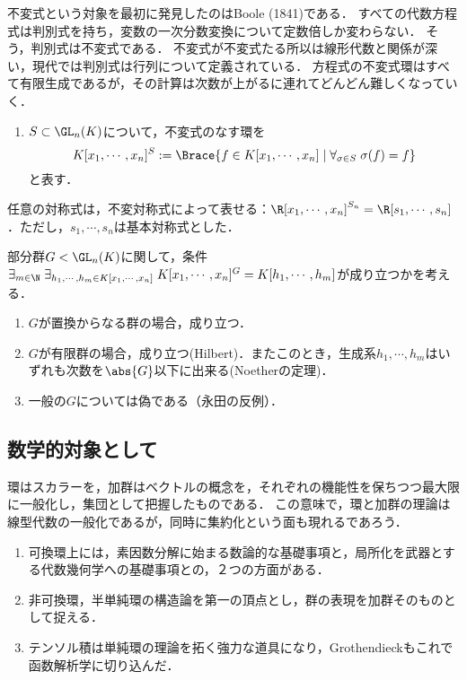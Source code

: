 \documentclass[uplatex,dvipdfmx]{jsreport}
\begin{document}
\begin{history}
    不変式という対象を最初に発見したのはBoole (1841)である．
    すべての代数方程式は判別式を持ち，変数の一次分数変換について定数倍しか変わらない．
    そう，判別式は不変式である．
    不変式が不変式たる所以は線形代数と関係が深い，現代では判別式は行列について定義されている．
    方程式の不変式環はすべて有限生成であるが，その計算は次数が上がるに連れてどんどん難しくなっていく．
\end{history}

\begin{definition}\mbox{}
    \begin{enumerate}
        \item $S\subset\GL_n(K)$について，不変式のなす環を
        \[K[x_1,\cdots,x_n]^S:=\Brace{f\in K[x_1,\cdots,x_n]\mid\forall_{\sigma\in S}\;\sigma(f)=f}\]
        と表す．
    \end{enumerate}
\end{definition}

\begin{corollary}
    任意の対称式は，不変対称式によって表せる：$\R[x_1,\cdots,x_n]^{S_n}=\R[s_1,\cdots,s_n]$．ただし，$s_1,\cdots,s_n$は基本対称式とした．
\end{corollary}

\begin{theorem}[Hilbert 14]
    部分群$G<\GL_n(K)$に関して，条件
    $\exists_{m\in\N}\;\exists_{h_1,\cdots,h_m\in K[x_1,\cdots,x_n]}\;K[x_1,\cdots,x_n]^G=K[h_1,\cdots,h_m]$が成り立つかを考える．
    \begin{enumerate}
        \item $G$が置換からなる群の場合，成り立つ．
        \item $G$が有限群の場合，成り立つ(Hilbert)．またこのとき，生成系$h_1,\cdots,h_m$はいずれも次数を$\abs{G}$以下に出来る(Noetherの定理)．
        \item 一般の$G$については偽である（永田の反例）．
    \end{enumerate}
\end{theorem}

\subsection{数学的対象として}

\begin{remarks}
    環はスカラーを，加群はベクトルの概念を，それぞれの機能性を保ちつつ最大限に一般化し，集団として把握したものである．
    この意味で，環と加群の理論は線型代数の一般化であるが，同時に集約化という面も現れるであろう．
    \begin{enumerate}
        \item 可換環上には，素因数分解に始まる数論的な基礎事項と，局所化を武器とする代数幾何学への基礎事項との，２つの方面がある．
        \item 非可換環，半単純環の構造論を第一の頂点とし，群の表現を加群そのものとして捉える．
        \item テンソル積は単純環の理論を拓く強力な道具になり，Grothendieckもこれで函数解析学に切り込んだ．
    \end{enumerate}
\end{remarks}
\end{document}
